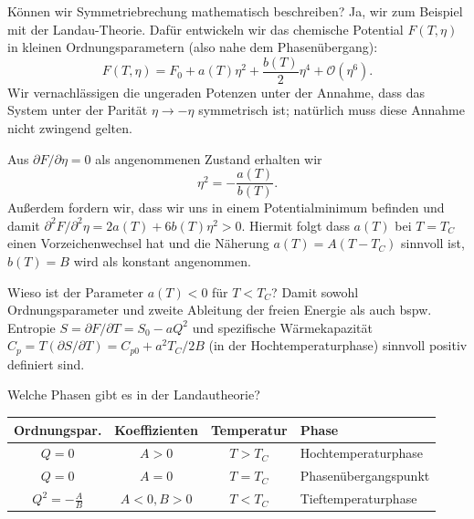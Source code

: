 \begin{fquestion}{Können wir Symmetriebrechung mathematisch beschreiben? }
    Ja, wir zum Beispiel mit der Landau-Theorie. 
    Dafür entwickeln wir das chemische Potential $F(T, \eta)$ in kleinen Ordnungsparametern (also nahe dem Phasenübergang):
    \[F(T, \eta) = F_0 + a(T) \eta^2 + \frac{b(T)}{2} \eta^4 + \mathcal{O}(\eta^6).\]
    Wir vernachlässigen die ungeraden Potenzen unter der Annahme, dass das System unter der Parität $\eta \rightarrow -\eta$ symmetrisch ist; natürlich muss diese Annahme nicht zwingend gelten.
    
    Aus $\partial F / \partial \eta = 0$ als angenommenen Zustand erhalten wir
    \[\eta^2 = - \frac{a(T)}{b(T)}.\]
    Außerdem fordern wir, dass wir uns in einem Potentialminimum befinden und damit $\partial^2 F / \partial^2 \eta = 2 a(T) + 6 b(T) \eta^2 > 0$.
    Hiermit folgt dass $a(T)$ bei $T=T_C$ einen Vorzeichenwechsel hat und die Näherung $a(T) = A (T - T_C)$ sinnvoll ist, $b(T) = B$ wird als konstant angenommen.
\end{fquestion}

\begin{fquestion}{Wieso ist der Parameter $a(T) < 0$ für $T < T_C$? }
    Damit sowohl Ordnungsparameter und zweite Ableitung der freien Energie als auch bspw. Entropie $S = \partial F / \partial T = S_0 - a Q^2$ und spezifische Wärmekapazität $C_p = T (\partial S / \partial T) = C_{p 0} + a^2 T_C/2 B$ (in der Hochtemperaturphase) sinnvoll positiv definiert sind.
\end{fquestion}

\begin{fquestion}{Welche Phasen gibt es in der Landautheorie?}
    \begin{minipage}{\linewidth}
        \begin{table}[H]
            \centering
            \begin{tabular}{|c|c|c|l|}
                \hline
                \textbf{Ordnungspar.} & \textbf{Koeffizienten} & \textbf{Temperatur} & \textbf{Phase} \\
                \hline
                $Q = 0$ & $A > 0$ & $T > T_C$ & Hochtemperaturphase \\
                \hline
                $Q = 0$ & $A = 0$ & $T = T_C$ & Phasenübergangspunkt \\
                \hline
                $Q^2 = -\frac{A}{B}$ & $A < 0, B > 0$ & $T < T_C$ & Tieftemperaturphase \\
                \hline
            \end{tabular}
        \end{table}
    \end{minipage}
\end{fquestion}

